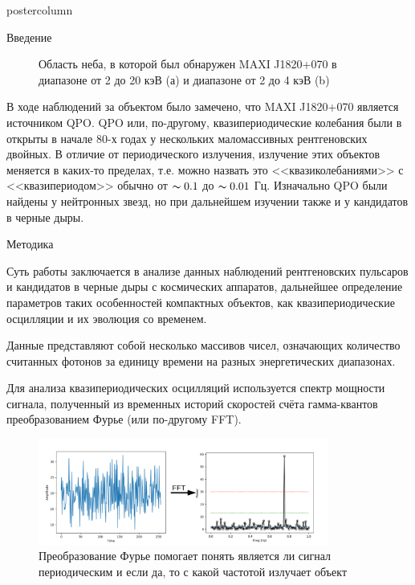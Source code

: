 \documentclass{beamer}
\begin{document}
\begin{frame}
\begin{columns}
\begin{column}{.43\textwidth}
\begin{beamercolorbox}[center]{postercolumn}
\begin{minipage}{.98\textwidth}
{\begin{myblock}{Введение}
\begin{figure}[h!]
\begin{subfigure}[b]{0.4\linewidth}
								\caption{}
							\label{img:bhpart}
							\end{subfigure}
							\caption{Область неба, в которой был обнаружен MAXI J1820+070 в диапазоне от 2 до 20 кэВ (а) и диапазоне от 2 до 4 кэВ (b)}
							\label{img:bh}
						\end{figure}
						
						В ходе наблюдений за объектом было замечено, что  MAXI J1820+070 является источником QPO. QPO или, по-другому, квазипериодические колебания были в открыты в начале 80-х годах у нескольких маломассивных рентгеновских двойных. В отличие от периодического излучения, излучение этих объектов меняется в каких-то пределах, т.е. можно назвать это <<квазиколебаниями>> с <<квазипериодом>> обычно от $\thicksim 0.1$ до $\thicksim 0.01$ Гц. Изначально QPO были найдены у нейтронных звезд, но при дальнейшем изучении также и у кандидатов в черные дыры.
					\end{myblock}\vfill
					\begin{myblock}{Методика}
						
						Суть работы заключается в анализе данных наблюдений рентгеновских пульсаров и кандидатов в черные дыры с космических аппаратов, дальнейшее определение параметров таких особенностей компактных объектов, как квазипериодические осцилляции и их эволюция со временем.
						
						Данные представляют собой несколько массивов чисел, означающих количество считанных фотонов за единицу времени на разных энергетических диапазонах.
	
						Для анализа квазипериодических осцилляций используется спектр мощности сигнала, полученный из временных историй скоростей счёта гамма-квантов преобразованием Фурье (или по-другому FFT).
						\begin{figure}
							\centering
							\includegraphics[width=0.85\textwidth]{FFT}
							\caption{Преобразование Фурье помогает понять является ли сигнал периодическим и если да, то с какой частотой излучает объект}
						\end{figure}
	

\end{myblock}}
\end{minipage}
\end{beamercolorbox}
\end{column}
\end{columns}
\end{frame}
\end{document}

